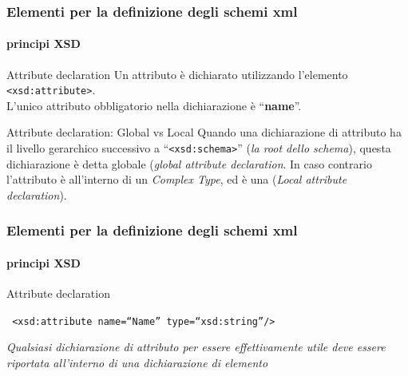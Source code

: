 


\begin{frame}
	\frametitle{Elementi per la definizione degli schemi xml}
	\framesubtitle{principi XSD}
	\addtocounter{nframe}{1}

	\begin{block}{Attribute declaration}
		Un attributo è dichiarato utilizzando l'elemento \texttt{<xsd:attribute>}. \\ L'unico attributo obbligatorio nella dichiarazione è ``\textbf{name}''.
	\end{block}

	\begin{block}{Attribute declaration: Global vs Local}
		Quando una dichiarazione di attributo ha il livello gerarchico successivo a ``\texttt{<xsd:schema>}'' (\textit{la root dello schema}), questa dichiarazione è detta globale (\textit{global attribute declaration}. In caso contrario l'attributo è all'interno di un \textit{Complex Type}, ed è una (\textit{Local attribute declaration}).
	\end{block}

\end{frame}

\begin{frame}
	\frametitle{Elementi per la definizione degli schemi xml}
	\framesubtitle{principi XSD}
	\addtocounter{nframe}{1}
	\begin{block}{Attribute declaration}

		\texttt{
			<xsd:attribute name=``Name'' type=``xsd:string''/>
		}

	\end{block}
	\textit{Qualsiasi dichiarazione di attributo per essere effettivamente utile deve essere riportata all'interno di una dichiarazione di elemento}
\end{frame}



